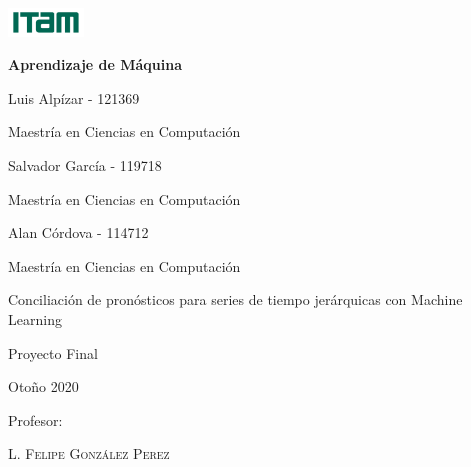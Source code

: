 \documentclass[oneside]{report}
\begin{document}
\begin{titlepage}
	\centering
	\includegraphics[width=0.15\textwidth]{imgs/logo-ITAM.png}
	    \par\vspace{2cm}
	{\huge\bfseries Aprendizaje de Máquina\par}
	    \vspace{1cm}

	{\Large Luis Alpízar - 121369\par}
	{Maestría en Ciencias en Computación\par}
	    \vspace{0.5cm}
	    
	{\Large Salvador García - 119718\par}
	{Maestría en Ciencias en Computación\par}
	\vspace{0.5cm}
		
	{\Large Alan Córdova - 114712\par}
	{Maestría en Ciencias en Computación\par}
	    \vspace{0.5cm}
	    
	{\Large Conciliación de pronósticos para series de tiempo jerárquicas con Machine Learning\par}
	    \vspace{0.5cm}
	{\Large Proyecto Final\par}
	    \vspace{1cm}
	{\Large Otoño 2020\par}
	    \vfill
	Profesor:\par
	    \textsc{L. Felipe González Perez}
	    \vfill
\end{titlepage}



\tableofcontents






\end{document}
